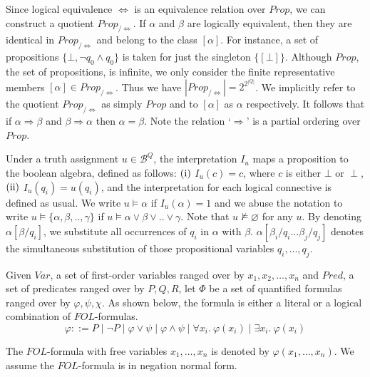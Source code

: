Since logical equivalence \( \Leftrightarrow \) is an equivalence relation over
\( \mathit{Prop} \), we can construct a quotient \(
\mathit{Prop}_{/\Leftrightarrow} \). If \( \alpha \) and \( \beta \) are
logically equivalent, then they are identical in \(
\mathit{Prop}_{/\Leftrightarrow} \) and belong to the class \( [\alpha] \). For
instance, a set of propositions \( \{ \bot, \neg q_0 \wedge q_0 \} \) is taken for
just the singleton \( \{ [\bot] \} \). Although \( \mathit{Prop} \), the set of
propositions, is infinite, we only consider the finite representative members \(
[\alpha] \in \mathit{Prop}_{/\Leftrightarrow} \). Thus we have \(
|\mathit{Prop}_{/\Leftrightarrow}| = 2^{2^{|Q|}} \). We implicitly refer to the
quotient \( \mathit{Prop}_{/\Leftrightarrow} \) as simply \( \mathit{Prop} \)
and to \( [\alpha] \) as \( \alpha \) respectively.  It follows that if \(
\alpha \Rightarrow \beta \) and \( \beta \Rightarrow \alpha \) then \( \alpha =
\beta \). Note the relation `\( \Rightarrow \)' is a partial ordering over \(
\mathit{Prop} \).

Under a truth assignment \( u \in \mathcal{B}^Q \), the interpretation \( I_u \)
maps a proposition to the boolean algebra, defined as follows: \( (\rm i) \) \(
I_u(c) = c \), where \( c \) is either \( \bot \) or \( \perp \), \( (\rm ii) \)
\( I_u(q_i) = u(q_i) \), and the interpretation for each logical connective is
defined as usual. We write \( u \models \alpha \) if \( I_u(\alpha) = 1 \) and
we abuse the notation to write \( u \models \{\alpha, \beta, .., \gamma \} \) if
\( u \models \alpha \vee \beta \vee ..\vee \gamma \). Note that \( u \not\models
\varnothing \) for any \( u \). By denoting \( \alpha[\beta/q_i] \), we
substitute all occurrences of \( q_i \) in \( \alpha \) with \( \beta \). \(
\alpha[\beta_i/q_i \ldots \beta_j/q_j] \) denotes the simultaneous 
substitution
of those propositional variables \( q_i, \ldots, q_j \).

Given \( \mathit{Var} \), a set of first-order variables ranged over by \( x_1,
x_2, \ldots, x_n \) and \( \mathit{Pred} \), a set of predicates ranged over by
\( P, Q, R \), let \( \Phi \) be a set of quantified formulas ranged over by \(
\varphi, \psi, \chi \). As shown below, the formula is either a literal or a
logical combination of \( \mathit{FOL} \)-formulas.
\[
  \varphi ::= P \mid \neg P
  \mid \varphi \vee \psi \mid \varphi \wedge \psi
  \mid \forall x_i .\ \varphi(x_i) \mid \exists x_i .\ \varphi(x_i) 
\]

The \( \mathit{FOL} \)-formula with free variables \( x_1, \ldots, x_n \) is
denoted by \( \varphi(x_1, \ldots, x_n) \). We assume the \( \mathit{FOL}
\)-formula is in negation normal form.
